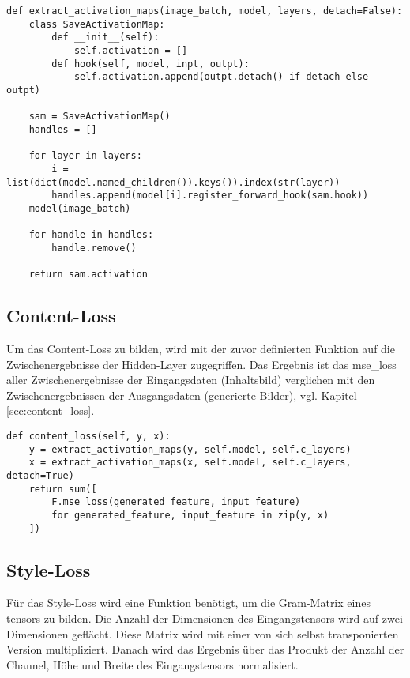 \begin{listing}[H]
\begin{verbatim}
def extract_activation_maps(image_batch, model, layers, detach=False):
    class SaveActivationMap:
        def __init__(self):
            self.activation = []
        def hook(self, model, inpt, outpt):
            self.activation.append(outpt.detach() if detach else outpt)

    sam = SaveActivationMap()
    handles = []

    for layer in layers:
        i = list(dict(model.named_children()).keys()).index(str(layer))
        handles.append(model[i].register_forward_hook(sam.hook))
    model(image_batch)

    for handle in handles:
        handle.remove()

    return sam.activation
\end{verbatim}
\end{listing}

\subsection{Content-Loss}

Um das Content-Loss zu bilden, wird mit der zuvor definierten Funktion auf die Zwischenergebnisse der Hidden-Layer zugegriffen.
Das Ergebnis ist das \gls{mse_loss} aller Zwischenergebnisse der Eingangsdaten (Inhaltsbild) verglichen mit den Zwischenergebnissen der Ausgangsdaten (generierte Bilder), vgl. Kapitel \ref{sec:content_loss}.

\begin{listing}[H]
\begin{verbatim}
def content_loss(self, y, x):
    y = extract_activation_maps(y, self.model, self.c_layers)
    x = extract_activation_maps(x, self.model, self.c_layers, detach=True)
    return sum([
        F.mse_loss(generated_feature, input_feature)
        for generated_feature, input_feature in zip(y, x)
    ])
\end{verbatim}
\end{listing}

\subsection{Style-Loss}

Für das Style-Loss wird eine Funktion benötigt, um die Gram-Matrix eines \gls{tensor}s zu bilden. Die Anzahl der Dimensionen des Eingangstensors wird auf zwei Dimensionen geflächt. Diese Matrix wird mit einer von sich selbst transponierten Version multipliziert. Danach wird das Ergebnis über das Produkt der Anzahl der Channel, Höhe und Breite des Eingangstensors normalisiert.

